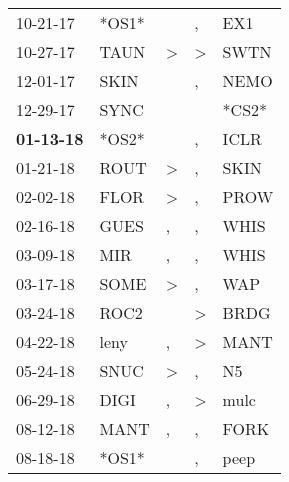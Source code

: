 \begin{supertabular}{p{0.07\textwidth}p{0.06\textwidth}p{0.02\textwidth}p{0.02\textwidth}p{0.06\textwidth}}
          10-21-17\textsuperscript{} &                   *OS1* &                  &             , &   EX1\textsuperscript{} \\
          10-27-17\textsuperscript{} &  TAUN\textsuperscript{} &     \textgreater &  \textgreater &  SWTN\textsuperscript{} \\
          12-01-17\textsuperscript{} &  SKIN\textsuperscript{} &                  &             , &  NEMO\textsuperscript{} \\
          12-29-17\textsuperscript{} &  SYNC\textsuperscript{} &                  &               &                   *CS2* \\
 \textbf{01-13-18\textsuperscript{}} &                   *OS2* &                  &             , &  ICLR\textsuperscript{} \\
          01-21-18\textsuperscript{} &  ROUT\textsuperscript{} &     \textgreater &             , &  SKIN\textsuperscript{} \\
          02-02-18\textsuperscript{} &  FLOR\textsuperscript{} &     \textgreater &             , &  PROW\textsuperscript{} \\
          02-16-18\textsuperscript{} &  GUES\textsuperscript{} &                , &             , &  WHIS\textsuperscript{} \\
          03-09-18\textsuperscript{} &   MIR\textsuperscript{} &                , &             , &  WHIS\textsuperscript{} \\
          03-17-18\textsuperscript{} &  SOME\textsuperscript{} &     \textgreater &             , &   WAP\textsuperscript{} \\
          03-24-18\textsuperscript{} &  ROC2\textsuperscript{} &                  &  \textgreater &  BRDG\textsuperscript{} \\
          04-22-18\textsuperscript{} &  leny\textsuperscript{} &                , &  \textgreater &  MANT\textsuperscript{} \\
          05-24-18\textsuperscript{} &  SNUC\textsuperscript{} &     \textgreater &             , &    N5\textsuperscript{} \\
          06-29-18\textsuperscript{} &  DIGI\textsuperscript{} &                , &  \textgreater &  mulc\textsuperscript{} \\
          08-12-18\textsuperscript{} &  MANT\textsuperscript{} &                , &             , &  FORK\textsuperscript{} \\
          08-18-18\textsuperscript{} &                   *OS1* &                  &             , &  peep\textsuperscript{} \\

\end{supertabular}
